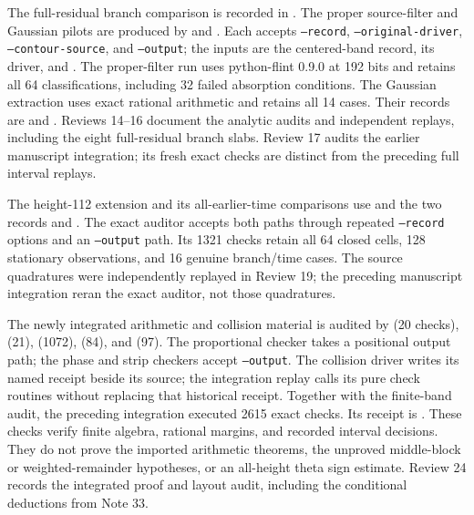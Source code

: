 \documentclass[11pt]{article}
\numberwithin{equation}{section}
\theoremstyle{definition}
\theoremstyle{remark}
\begin{document}
The full-residual branch comparison is recorded in
.
The proper source-filter and Gaussian pilots are produced by
 and
.
Each accepts \texttt{--record}, \texttt{--original-driver},
\texttt{--contour-source}, and \texttt{--output}; the inputs are the
centered-band record, its driver, and
.
The proper-filter run uses python-flint 0.9.0 at 192 bits and retains
all 64 classifications, including 32 failed absorption conditions.
The Gaussian extraction uses exact rational arithmetic and retains all
14 cases. Their records are
 and
.
Reviews 14--16 document the analytic audits and independent replays,
including the eight full-residual branch slabs. Review 17 audits the
earlier manuscript integration; its fresh exact checks are distinct
from the preceding full interval replays.

The height-112 extension and its all-earlier-time comparisons use
 and the two records
 and
.
The exact auditor 
accepts both paths through repeated \texttt{--record} options and an
\texttt{--output} path. Its 1321 checks retain all 64 closed cells,
128 stationary observations, and 16 genuine branch/time cases.
The source quadratures were independently replayed in Review 19; the
preceding manuscript integration reran the exact auditor, not those quadratures.

The newly integrated arithmetic and collision material is audited by
 (20 checks),
 (21),
 (1072),
 (84), and
 (97).
The proportional checker takes a positional output path; the phase and
strip checkers accept \texttt{--output}. The collision driver writes its
named receipt beside its source; the integration replay calls its pure
check routines without replacing that historical receipt.
Together with the finite-band audit, the preceding integration executed
2615 exact checks. Its receipt is
.
These checks verify finite algebra, rational margins, and recorded
interval decisions. They do not prove the imported arithmetic theorems,
the unproved middle-block or weighted-remainder hypotheses, or an
all-height theta sign estimate. Review 24 records the integrated proof
and layout audit, including the conditional deductions from Note 33.
\end{document}
